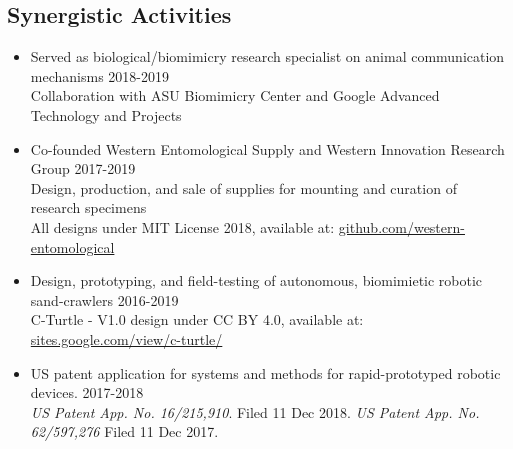 \documentclass[11pt,a4paper]{extarticle}
\begin{document}
\subsection*{Synergistic Activities}
	\begin{itemize}
		\item Served as biological/biomimicry research specialist on animal communication mechanisms \tabto*{5.65in} 2018-2019
		\\
		Collaboration with ASU Biomimicry Center and Google Advanced Technology and Projects
		\item Co-founded Western Entomological Supply and Western Innovation Research Group \tabto*{5.65in} 2017-2019
		\\
		Design, production, and sale of supplies for mounting and curation of research specimens
		\\
		All designs under MIT License {\textcopyright} 2018, available at: \href{https://github.com/western-entomological}{github.com/western-entomological}
		\item Design, prototyping, and field-testing of autonomous, biomimietic robotic sand-crawlers \tabto*{5.65in} 2016-2019
		\\
		C-Turtle - V1.0 design under CC BY 4.0, available at: \href{https://sites.google.com/view/c-turtle/}{sites.google.com/view/c-turtle/}
		\item US patent application for systems and methods for rapid-prototyped robotic devices. \tabto*{5.65in} 2017-2018
		\\
		\textit{US Patent App. No. 16/215,910}. Filed 11 Dec 2018.
		\textit{US Patent App. No. 62/597,276} Filed 11 Dec 2017.
	\end{itemize}
	
\end{document}
